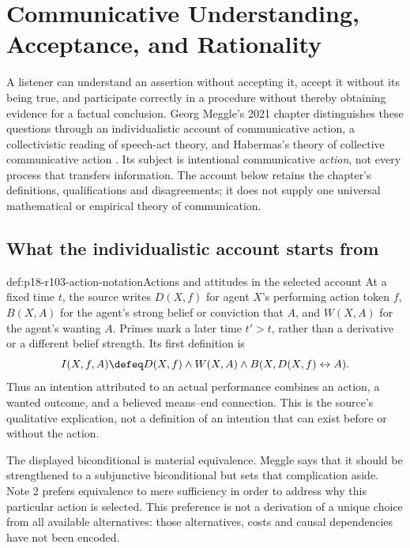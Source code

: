 \chapter{Communicative Understanding, Acceptance, and Rationality}
\label{sec:p18-rationality-10-3}

A listener can understand an assertion without accepting it, accept it
without its being true, and participate correctly in a procedure without
thereby obtaining evidence for a factual conclusion. Georg Meggle's 2021
chapter distinguishes these questions through an individualistic account
of communicative action, a collectivistic reading of speech-act theory,
and Habermas's theory of collective communicative action
\cite[pp.~601--610]{Meggle2021RationalityCommunication}.
Its subject is intentional communicative \emph{action}, not every process
that transfers information. The account below retains the chapter's
definitions, qualifications and disagreements; it does not supply one
universal mathematical or empirical theory of communication.

\section{What the individualistic account starts from}

\begin{hbdefinition}{def:p18-r103-action-notation}{Actions and attitudes in the selected account}
At a fixed time \(t\), the source writes \(D(X,f)\) for agent
\(X\)'s performing action token \(f\), \(B(X,A)\) for the agent's
strong belief or conviction that \(A\), and \(W(X,A)\) for the
agent's wanting \(A\). Primes mark a later time \(t'>t\), rather
than a derivative or a different belief strength. Its first definition is
\[
 I(X,f,A)\defeq D(X,f)\land W(X,A)
                    \land B(X,D(X,f)\leftrightarrow A).
\]
Thus an intention attributed to an actual performance combines an action,
a wanted outcome, and a believed means--end connection. This is the
source's qualitative explication, not a definition of an intention that
can exist before or without the action.

The displayed biconditional is material equivalence. Meggle says that
it should be strengthened to a subjunctive biconditional but sets that
complication aside. Note 2 prefers equivalence to mere sufficiency in
order to address why this particular action is selected. This preference
is not a derivation of a unique choice from all available alternatives:
those alternatives, costs and causal dependencies have not been encoded.
\cite[pp.~601--602; p.~609, n.~2]{Meggle2021RationalityCommunication}
\end{hbdefinition}

